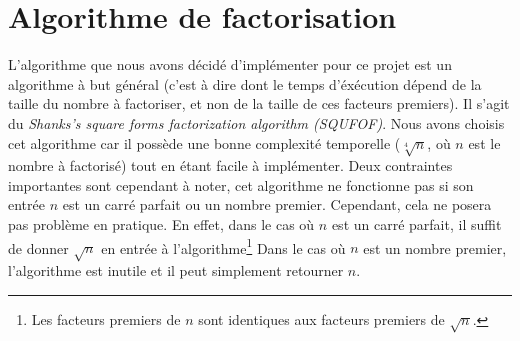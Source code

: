 \documentclass{scrartcl}
\begin{document}
\section{Algorithme de factorisation}
L'algorithme que nous avons décidé d'implémenter pour ce projet
est un algorithme à but général (c'est à dire dont le temps
d'éxécution dépend de la taille du nombre à factoriser, et
non de la taille de ces facteurs premiers). Il s'agit du
\textit{Shanks's square forms factorization algorithm (SQUFOF)}.
Nous avons choisis cet algorithme car il possède une bonne
complexité temporelle ($\sqrt[4]{n}$, où $n$ est le nombre à
factorisé) tout en étant facile à implémenter. Deux contraintes
importantes sont cependant à noter, cet algorithme ne fonctionne
pas si son entrée $n$ est un carré parfait ou un nombre premier. 
Cependant, cela ne posera pas problème en pratique.
En effet, dans le cas où $n$ est un carré parfait, il suffit de
donner $\sqrt{n}$ en entrée à l'algorithme\footnote{Les facteurs
premiers de $n$ sont identiques aux facteurs premiers de $\sqrt{n}$.}
Dans le cas où $n$ est un nombre premier, l'algorithme est inutile
et il peut simplement retourner $n$.



\end{document}
